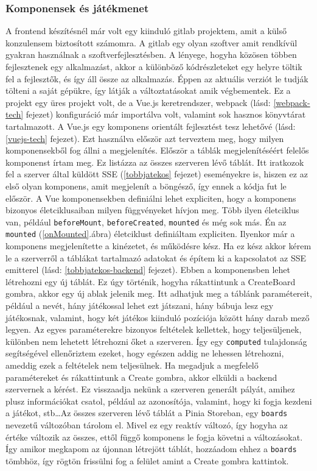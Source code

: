 \documentclass[a4paper,twoside]{article}
\begin{document}
\subsubsection{Komponensek és játékmenet}
A frontend készítésnél már volt egy kiinduló gitlab projektem, amit a külső konzulensem
biztosított számomra. A gitlab egy olyan szoftver amit rendkívül gyakran használnak a szoftverfejlesztésben. A lényege, hogyha közösen többen fejlesztenek egy alkalmazást, akkor a különböző kódrészleteket egy helyre töltik fel a fejlesztők, és így áll össze az alkalmazás. Éppen az aktuális verziót le tudják tölteni a saját gépükre, így látják a változtatásokat amik végbementek. Ez a projekt egy üres projekt volt, de a Vue.js keretrendszer, webpack (lásd: \ref{webpack-tech} fejezet)
konfiguráció már importálva volt, valamint sok hasznos könyvtárat tartalmazott. A Vue.js egy komponens orientált fejlesztést tesz lehetővé (lásd: \ref{vuejs-tech} fejezet). Ezt használva
először azt terveztem meg, hogy milyen komponensekből fog állni a megjelenítés.
Először a táblák megjelenítéséért felelős komponenst írtam meg. Ez listázza az összes
szerveren lévő táblát. Itt iratkozok fel a szerver által küldött SSE (\ref{tobbjatekos} fejezet) eseményekre is, hiszen ez az első olyan komponens, amit megjelenít a böngésző, így ennek a kódja fut le először. A Vue komponensekben definiálni lehet expliciten, hogy a komponens bizonyos életciklusaiban milyen függvényeket hívjon meg. Több ilyen életciklus van, például \verb|beforeMount|, \verb|beforeCreated|, \verb|mounted| és még sok más. Én az \verb|mounted| (\ref{onMounted}.ábra) életciklust definiáltam expliciten. Ilyenkor már a komponens megjelenítette a kinézetet, és működésre kész. Ha ez kész akkor kérem le a szerverről a táblákat tartalmazó adatokat és építem ki a kapcsolatot az SSE emitterel (lásd: \ref{tobbjatekos-backend} fejezet). Ebben a komponensben lehet létrehozni egy új táblát. Ez úgy történik, hogyha rákattintunk a CreateBoard gombra, akkor egy új ablak jelenik meg. Itt adhatjuk meg a táblánk paramétereit, például a nevét, hány játékossal lehet ezt játszani, hány bábuja lesz egy játékosnak, valamint, hogy két játékos kiinduló pozíciója között hány darab mező legyen. Az egyes paraméterekre bizonyos feltételek kellettek, hogy teljesüljenek, különben nem lehetett létrehozni őket a szerveren. Így egy \verb|computed| tulajdonság segítségével ellenőriztem ezeket, hogy egészen addig ne lehessen létrehozni, ameddig ezek a feltételek nem teljesülnek. Ha megadjuk a megfelelő paramétereket és rákattintunk a Create gombra, akkor elküldi a backend szervernek a kérést. Ez visszaadja nekünk a szerveren generált pályát, amihez plusz információkat csatol, például az azonosítója, valamint, hogy ki fogja kezdeni a játékot, stb\ldots Az összes szerveren lévő táblát a Pinia Storeban, egy \verb|boards| nevezetű változóban tárolom el. Mivel ez egy reaktív változó, így hogyha az értéke változik az összes, ettől függő komponens le fogja követni a változásokat. Így amikor megkapom az újonnan létrejött táblát, hozzáadom ehhez a \verb|boards| tömbhöz, így rögtön frissülni fog a felület amint a Create gombra kattintok. 
\end{document}
